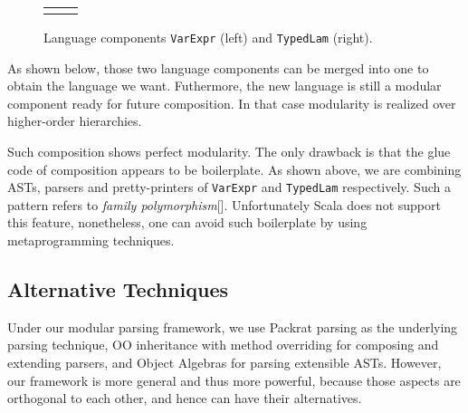 \begin{figure}[t]
\begin{tabular}{m{0.42\linewidth}m{0.52\linewidth}}
&
\end{tabular}
\caption{Language components \lstinline{VarExpr} (left) and \lstinline{TypedLam} (right).}\label{fig:lng-components}
\end{figure}

As shown below, those two language components can be merged into one to obtain the language we want. Futhermore, the new language is still a modular
component ready for future composition. In that case modularity is realized over higher-order hierarchies.

Such composition shows perfect modularity. The only
drawback is that the glue code of composition appears to be boilerplate. As shown above, we are combining ASTs, parsers and pretty-printers of
\lstinline{VarExpr} and \lstinline{TypedLam} respectively. Such a pattern refers to \textit{family polymorphism}[]. Unfortunately Scala does not
support this feature, nonetheless, one can avoid such boilerplate by using metaprogramming techniques.

\subsection{Alternative Techniques}

Under our modular parsing framework, we use Packrat parsing as the underlying parsing technique, OO inheritance with method overriding for composing and extending parsers, and Object Algebras for parsing extensible ASTs. However, our framework is more general and thus more powerful, because those aspects are orthogonal to each other, and hence can have their alternatives.

